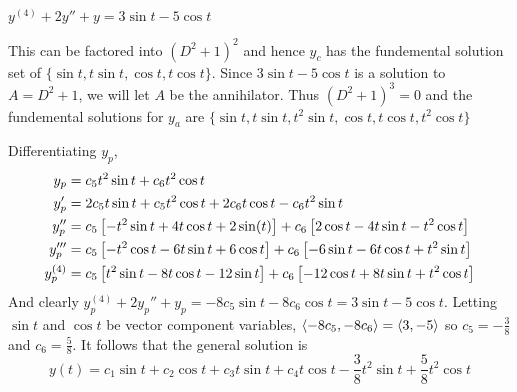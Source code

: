$y^{(4)} + 2y'' + y = 3 \sin t - 5 \cos t$

\soln This can be factored into $(D^2+1)^2$ and hence $y_c$ has the fundemental solution set of $\{ \sin t, t \sin t, \cos t, t \cos t\}$. Since $3 \sin t - 5 \cos t$ is a solution to $A = D^2 + 1$, we will let $A$ be the annihilator. Thus $(D^2+1)^3 = 0$ and the fundemental solutions for $y_a$ are $\{\sin t, t \sin t, t^2 \sin t, \cos t, t \cos t, t^2 \cos t\}$

\nl Differentiating $y_p$,
\begin{align*}
    y_p &= c_5 t^2 \sin t + c_6 t^2 \cos t\\
    y_p' &= 2c_5t \sin t + c_5 t^2 \cos t + 2c_6t \cos t - c_6 t^2 \sin t\\
    y_p'' &= c_5 \brac{-t^2 \sin t + 4t \cos t + 2 \sin(t)} + c_6\brac{ 2 \cos t - 4t \sin t - t^2 \cos t}\\
    y_p''' &= c_5 \brac{-t^2 \cos t - 6t \sin t + 6 \cos t} + c_6\brac{-6 \sin t - 6t \cos t + t^2 \sin t}\\
    y_p^{(4)} &= c_5 \brac{t^2 \sin t - 8t \cos t -12 \sin t} + c_6\brac{-12 \cos t + 8t \sin t + t^2 \cos t}\\
\end{align*} 
And clearly $y_p^{(4)} + 2y_p'' + y_p = -8c_5 \sin t - 8 c_6 \cos t = 3 \sin t - 5 \cos t$. Letting $\sin t$ and $\cos t$ be vector component variables, $\inner{-8c_5, -8c_6} = \inner{3, -5}$ so $c_5 = -\frac38$ and $c_6 = \frac58$. It follows that the general solution is
$$y(t) = c_1 \sin t + c_2 \cos t + c_3 t \sin t + c_4 t \cos t - \frac38 t^2 \sin t + \frac58 t^2 \cos t$$ 